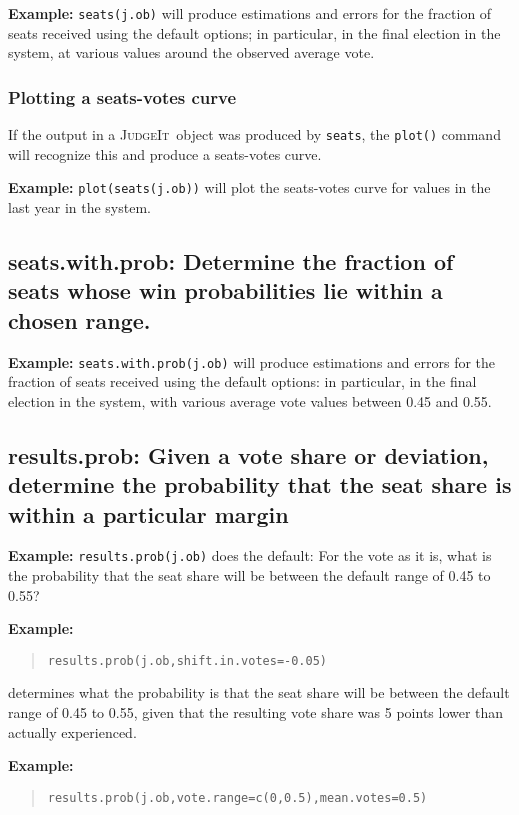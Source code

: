 \documentclass[oneside,letterpaper,titlepage]{article}
\newcommand{\JudgeIt}{\textsc{JudgeIt}\ }
\begin{document}
\textbf{Example:}
\texttt{seats(j.ob)} will produce estimations and errors for the fraction of seats received using the default options; in particular, in the final election in the system, at various values around the observed average vote.

\subsubsection*{Plotting a seats-votes curve}

If the output in a \JudgeIt object was produced by \texttt{seats}, the
\texttt{plot()} command will recognize this and produce a seats-votes
curve.

\textbf{Example:}
\texttt{plot(seats(j.ob))} will plot the seats-votes curve for values in the last year in the system.

\subsection*{seats.with.prob: Determine the fraction of seats whose win probabilities lie within a chosen range.}

\textbf{Example:} \texttt{seats.with.prob(j.ob)} will produce estimations and errors for the fraction of seats received using the default options: in particular, in the final election in the system, with various average vote values between 0.45 and 0.55.

\subsection*{results.prob: Given a vote share or deviation, determine the probability that the seat share is within a particular margin}

\textbf{Example:} \texttt{results.prob(j.ob)} does the default: For the vote as it is, what is the probability that the seat share will be between the default range of 0.45 to 0.55?

\textbf{Example:}
\begin{quote} \texttt{results.prob(j.ob,shift.in.votes=-0.05)} \end{quote} 
determines what the probability is that the seat share will be between the default range of 0.45 to 0.55, given that the resulting vote share was 5 points lower than actually experienced.

\textbf{Example:}
\begin{quote}\texttt{results.prob(j.ob,vote.range=c(0,0.5),mean.votes=0.5)} \end{quote}
\end{document}
